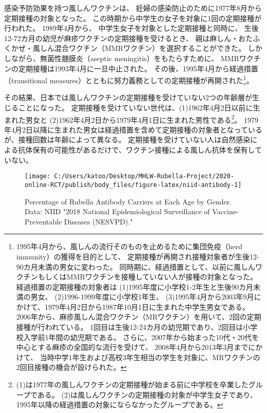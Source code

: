 \documentclass[
  11pt,
  a4paper,
]{article}
\begin{document}
感染予防効果を持つ風しんワクチンは、
妊婦の感染防止のために1977年8月から定期接種の対象となった。
この時期から中学生の女子を対象に1回の定期接種が行われた。
1989年4月から、
中学生女子を対象とした定期接種と同時に、
生後12-72カ月の幼児が麻疹ワクチンの定期接種を受けるとき、
親は麻しん・おたふくかぜ・風しん混合ワクチン（MMRワクチン）を選択することができた。
しかしながら、無菌性髄膜炎（aseptic meningitis）をもたらすために、
MMRワクチンの定期接種は1993年4月に一旦中止された。
その後、1995年4月から経過措置（transitional measures）とともに努力義務としての定期接種が再開された\footnote{1995年4月から、風しんの流行そのものを止めるために集団免疫（herd immunity）の獲得を目的として、
  定期接種が再開され接種対象者が生後12-90カ月未満の男女に変わった。
  同時期に、経過措置として、以前に風しんワクチンもしくはMMRワクチンを接種していない人が接種の対象となった。
  経過措置の定期接種の対象者は
  (1)1995年度に小学校1-2年生と生後90カ月未満の男女、
  (2)1996-1999年度に小学校1年生、
  (3)1995年4月から2003年9月にかけて、1979年4月2日から1987年10月1日に生まれた中学生男女である。
  2006年から、麻疹風しん混合ワクチン（MRワクチン）を用いて、2回の定期接種が行われている。
  1回目は生後12-24カ月の幼児期であり、2回目は小学校入学前1年間の幼児期である。
  さらに、2007年から始まった10代・20代を中心とする麻疹の全国的な流行を受けて、
  2008年4月から2013年3月までにかけて、
  当時中学1年生および高校3年生相当の学生を対象に、MRワクチンの2回目接種の機会が設けられた。}。

その結果、日本では風しんワクチンの定期接種を受けていない2つの年齢層が生じることになった。
定期接種を受けていない世代は、(1)1962年4月2日以前に生まれた男女と
(2)1962年4月2日から1979年4月1日に生まれた男性である\footnote{(1)は1977年の風しんワクチンの定期接種が始まる前に中学校を卒業したグループである。
  (2)は風しんワクチンの定期接種の対象が中学生女子であり、1995年以降の経過措置の対象にならなかったグループである。}。
1979年4月2日以降に生まれた男女は経過措置を含めて定期接種の対象者となっているが、接種回数は年齢によって異なる。
定期接種を受けていない人は自然感染による抗体保有の可能性があるだけで、ワクチン接種による風しん抗体を保有していない。

\begin{figure}[t]
\texttt{[image: C:/Users/katoo/Desktop/MHLW-Rubella-Project/2020-online-RCT/publish/body\_files/figure-latex/niid-antibody-1]} \caption{Percentage of Rubella Antibody Carriers at Each Age by Gender. Data: NIID "2018 National Epidemiological Surveillance of Vaccine-Preventable Diseases (NESVPD)."}\label{fig:niid-antibody}
\end{figure}
\end{document}
